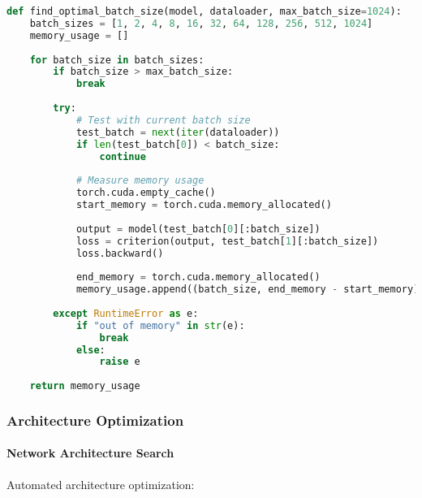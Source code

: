 \begin{lstlisting}[language=python, caption=Batch Size Optimization]
def find_optimal_batch_size(model, dataloader, max_batch_size=1024):
    batch_sizes = [1, 2, 4, 8, 16, 32, 64, 128, 256, 512, 1024]
    memory_usage = []
    
    for batch_size in batch_sizes:
        if batch_size > max_batch_size:
            break
            
        try:
            # Test with current batch size
            test_batch = next(iter(dataloader))
            if len(test_batch[0]) < batch_size:
                continue
                
            # Measure memory usage
            torch.cuda.empty_cache()
            start_memory = torch.cuda.memory_allocated()
            
            output = model(test_batch[0][:batch_size])
            loss = criterion(output, test_batch[1][:batch_size])
            loss.backward()
            
            end_memory = torch.cuda.memory_allocated()
            memory_usage.append((batch_size, end_memory - start_memory))
            
        except RuntimeError as e:
            if "out of memory" in str(e):
                break
            else:
                raise e
    
    return memory_usage
\end{lstlisting}

\subsubsection{Architecture Optimization}

\paragraph{Network Architecture Search}
Automated architecture optimization:

